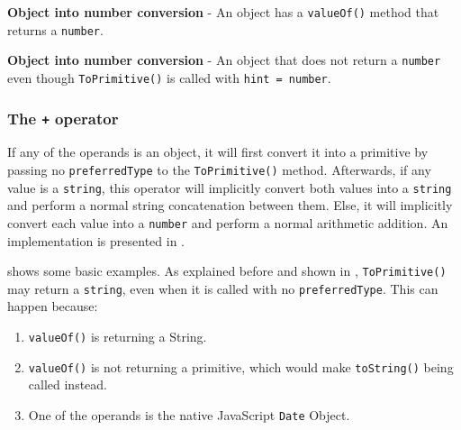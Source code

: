 \begin{code}
	\captionsetup{aboveskip=0pt, belowskip=10pt}
	\caption[Object into number conversion]{\textbf{Object into number conversion} - An object has a \texttt{valueOf()} method that returns a \texttt{number}.}
	\label{code:background-object-into-number}
\end{code}

\begin{code}
	\captionsetup{aboveskip=0pt, belowskip=10pt}
	\caption[Object into number conversion]{\textbf{Object into number conversion} - An object that does not return a \texttt{number} even though \texttt{ToPrimitive()} is called with \texttt{hint = number}.}
	\label{code:background-object-into-string-not-number-return-value}
\end{code}

\subsubsection{The \texttt{+} operator}
If any of the operands is an object, it will first convert it into a primitive by passing no \texttt{preferredType} to the \texttt{ToPrimitive()} method. Afterwards, if any value is a \texttt{string}, this operator will implicitly convert both values into a \texttt{string} and perform a normal string concatenation between them. Else, it will implicitly convert each value into a \texttt{number} and perform a normal arithmetic addition. An implementation is presented in .

 shows some basic examples. As explained before and shown in , \texttt{ToPrimitive()} may return a \texttt{string}, even when it is called with no \texttt{preferredType}. This can happen because:
\begin{enumerate}
	\item \texttt{valueOf()} is returning a String.
	\item \texttt{valueOf()} is not returning a primitive, which would make \texttt{toString()} being called instead.
	\item One of the operands is the native JavaScript \texttt{Date} Object.
\end{enumerate}

